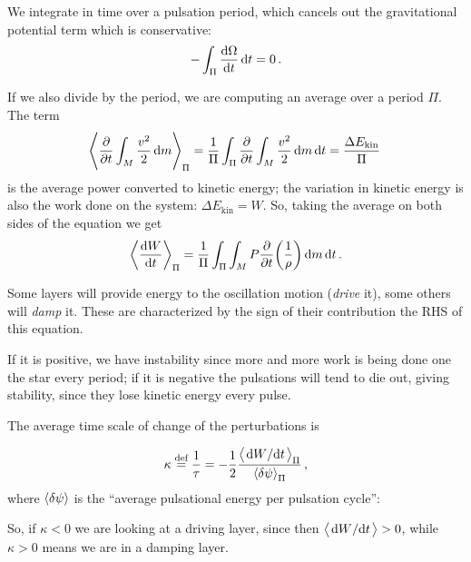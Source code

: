 \documentclass[main.tex]{subfiles}
\begin{document}
We integrate in time over a pulsation period, which cancels out the gravitational potential term which is conservative: 
%
\begin{align}
-\int_{\Pi } \dv{\Omega }{t} \dd{t} = 0
\,.
\end{align}

If we also divide by the period, we are computing an average over a period \(\Pi \). The term 
%
\begin{align}
\expval{\pdv{}{t} \int_{M} \frac{v^2}{2} \dd{m}}_{\Pi }
= \frac{1}{\Pi } \int_{\Pi } \pdv{}{t} \int_{M} \frac{v^2}{2} \dd{m} \dd{t} = \frac{ \Delta E _{\text{kin}}}{\Pi }
\,
\end{align}
%
is the average power converted to kinetic energy; the variation in kinetic energy is also the work done on the system: \(\Delta E _{\text{kin}} = W\). So, taking the average on both sides of the equation we get
%
\begin{equation} \label{eq:driving-damping-layers-1}
\expval{\dv{W}{t}}_\Pi = \frac{1}{\Pi} \int_\Pi \int_M   P \pdv{}{t} \qty(\frac{1}{\rho}) \dd{m} \dd{t}.
\end{equation}

Some layers will provide energy to the oscillation motion (\emph{drive} it), some others will \emph{damp} it.
These are characterized by the sign of their contribution the RHS of this equation.

If it is positive, we have instability since more and more work is being done one the star every period; if it is negative the pulsations will tend to die out, giving stability, since they lose kinetic energy every pulse.

The average time scale of change of the perturbations is

\begin{equation}
  \kappa \defeq \frac{1}{\tau} = -\frac{1}{2} \frac{\expval{\dv*{W}{t}}_\Pi}{\expval{ \delta \psi}_\Pi }
\,,
\end{equation}
%
where \(\expval{ \delta \psi }\) is the ``average pulsational energy per pulsation cycle'': 

So, if \(\kappa < 0\) we are looking at a driving layer, since then \(\expval{ \dv*{W}{t}} >0\), while \(\kappa > 0\) means we are in a damping layer. 
\end{document}
